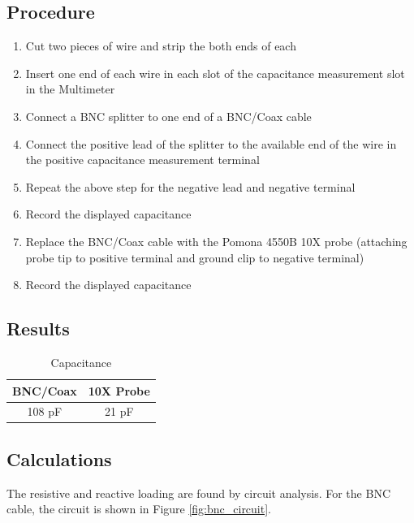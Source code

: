 \documentclass[12pt,letterpaper]{report}
\begin{document}
\subsection*{Procedure}
\begin{enumerate}
	\item Cut two pieces of wire and strip the both ends of each
	\item Insert one end of each wire in each slot of the capacitance measurement slot in the Multimeter
	\item Connect a BNC splitter to one end of a BNC/Coax cable
	\item Connect the positive lead of the splitter to the available end of the wire in the positive capacitance measurement terminal
	\item Repeat the above step for the negative lead and negative terminal
	\item Record the displayed capacitance
	\item Replace the BNC/Coax cable with the Pomona 4550B 10X probe (attaching probe tip to positive terminal and ground clip to negative terminal)
	\item Record the displayed capacitance
\end{enumerate}
\subsection*{Results}
\begin{center}
\begin{table}[ht]
\caption{Capacitance}
\centering
	\begin{tabular}{| c | c |}
	\hline
	
	\textbf{BNC/Coax} & \textbf{10X Probe} \\
	\hline
	108 pF & 21 pF \\

	\hline
	\end{tabular}
\end{table}
\end{center}

\subsection*{Calculations}
The resistive and reactive loading are found by circuit analysis. For the BNC cable, the circuit is shown in Figure \ref{fig:bnc_circuit}.
\end{document}
